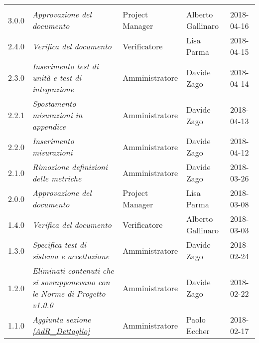 \newpage 
\section*{}
\begin{table}[H]
	\centering
	\begin{tabular}{C{2cm}|C{4cm}|C{3cm}|C{3cm}|R{2cm}}
		
		 & & & & \\
		
			3.0.0 & \emph{Approvazione del documento} & Project Manager & Alberto Gallinaro & 2018-04-16 \\
		\hline
		
		2.4.0 & \emph{Verifica del documento} & Verificatore &  Lisa Parma & 2018-04-15\\
		\hline
		
		2.3.0 & \emph{Inserimento test di unità e test di integrazione} & Amministratore & Davide Zago & 2018-04-14 \\
		\hline
		
		2.2.1 & \emph{Spostamento misurazioni in appendice} & Amministratore & Davide Zago & 2018-04-13 \\
		\hline
		
		2.2.0 & \emph{Inserimento misurazioni} & Amministratore & Davide Zago & 2018-04-12 \\
		\hline
		
		2.1.0 & \emph{Rimozione definizioni delle metriche} & Amministratore & Davide Zago & 2018-03-26 \\
		\hline

		2.0.0 & \emph{Approvazione del documento} & Project Manager & Lisa Parma & 2018-03-08 \\
		\hline
		
		1.4.0 & \emph{Verifica del documento} & Verificatore &  Alberto Gallinaro & 2018-03-03\\
		\hline
		
		1.3.0 & \emph{Specifica test di sistema e accettazione} & Amministratore &  Davide Zago & 2018-02-24 \\
		\hline
		
		1.2.0 & \emph{Eliminati contenuti che si sovrapponevano con le Norme di Progetto v1.0.0} & Amministratore &  Davide Zago & 2018-02-22 \\
		\hline
		
		1.1.0 & \emph{Aggiunta sezione \ref{AdR_Dettaglio}} & Amministratore &  Paolo Eccher & 2018-02-17 \\
		\hline
		

\end{tabular}
\end{table}
